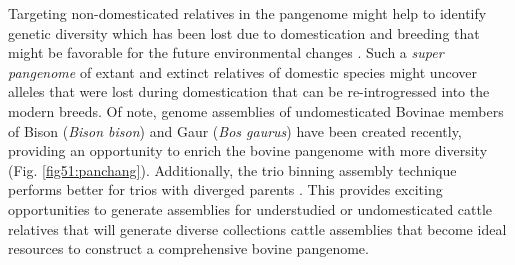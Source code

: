 \documentclass[../main.tex]{subfiles}
\begin{document}
Targeting non-domesticated relatives in the pangenome might help to identify genetic diversity which has been lost due to domestication and breeding that might be favorable for the future environmental changes \citep{khan2020super}. Such a \emph{super pangenome} of extant and extinct relatives of domestic species might uncover alleles that were lost during domestication that can be re-introgressed into the modern breeds. Of note, genome assemblies of undomesticated Bovinae members of Bison (\emph{Bison bison}) \citep{oppenheimer2021reference} and Gaur (\emph{Bos gaurus}) have been created recently, providing an opportunity to enrich the bovine pangenome with more diversity (Fig. \ref{fig51:panchang}). Additionally, the trio binning assembly technique performs better for trios with diverged parents \citep{rice2020continuous,heaton2021reference}. This provides exciting opportunities to generate assemblies for understudied or undomesticated cattle relatives that will generate diverse collections cattle assemblies that become ideal resources to construct a comprehensive bovine pangenome.

\singlespacing
\footnotesize






\ifdefined\BuildingFromMainFile
\else
   
\end{document}
